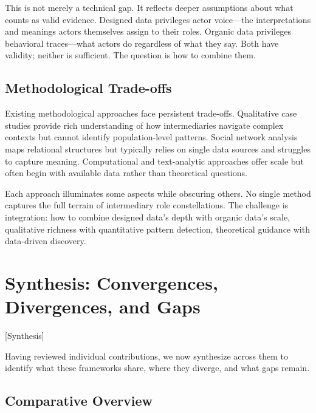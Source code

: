 \documentclass[../main.tex]{subfiles}
\begin{document}
This is not merely a technical gap. It reflects deeper assumptions about what counts as valid evidence. Designed data privileges actor voice---the interpretations and meanings actors themselves assign to their roles. Organic data privileges behavioral traces---what actors do regardless of what they say. Both have validity; neither is sufficient. The question is how to combine them.

\subsection{Methodological Trade-offs}

Existing methodological approaches face persistent trade-offs. Qualitative case studies provide rich understanding of how intermediaries navigate complex contexts but cannot identify population-level patterns. Social network analysis maps relational structures but typically relies on single data sources and struggles to capture meaning. Computational and text-analytic approaches offer scale but often begin with available data rather than theoretical questions.

Each approach illuminates some aspects while obscuring others. No single method captures the full terrain of intermediary role constellations. The challenge is integration: how to combine designed data's depth with organic data's scale, qualitative richness with quantitative pattern detection, theoretical guidance with data-driven discovery.


\section{Synthesis: Convergences, Divergences, and Gaps}[Synthesis]

Having reviewed individual contributions, we now synthesize across them to identify what these frameworks share, where they diverge, and what gaps remain.

\subsection{Comparative Overview}
\end{document}

